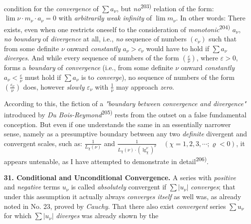\thispagestyle{fancy}

\vspace{0.5cm}

condition for the \textit{convergence} of $\sum a_\nu$, but \textit{no}\textsuperscript{203)} relation of the form: $\lim \nu \cdot m_\nu \cdot a_\nu = 0$ with \textit{arbitrarily weak infinity} of $\lim m_\nu$. In other words: There exists, even when one restricts oneself to the consideration of \textit{monotonic}\textsuperscript{204)} $a_\nu$, \textit{no boundary} of \textit{divergence} at all, i.e., \textit{no} sequence of numbers $(c_\nu)$ such that from some definite $\nu$ onward \textit{constantly} $a_\nu > c_\nu$ would have to hold if $\sum a_\nu$ \textit{diverges}. And while every sequence of numbers of the form $(\frac{\varepsilon}{\nu})$, where $\varepsilon > 0$, forms a \textit{boundary} of \textit{convergence} (i.e., from some definite $\nu$ onward \textit{constantly} $a_\nu < \frac{\varepsilon}{\nu}$ must hold if $\sum a_\nu$ is to \textit{converge}), no sequence of numbers of the form $(\frac{\varepsilon_\nu}{\nu})$ does, however \textit{slowly} $\varepsilon_\nu$ with $\frac{1}{\nu}$ may approach \textit{zero}.

According to this, the fiction of a \textit{"boundary between convergence and divergence"} introduced by \textit{Du Bois-Reymond}\textsuperscript{205)} rests from the outset on a false fundamental conception. But even if one understands the same in an essentially narrower sense, namely as a presumptive boundary between any two \textit{definite} divergent and convergent scales, such as: $\frac{1}{L_{\chi}(\nu)}$ and $\frac{1}{L_{\chi}(\nu) \cdot (\lg_\chi^\nu)^\varrho} \quad (\chi = 1, 2, 3, \cdots ; \varrho < 0) $, it appears untenable, as I have attempted to demonstrate in detail\textsuperscript{206)}.

\vspace{0.5cm}
\textbf{31. Conditional and Unconditional Convergence.} A series with \textit{positive} and \textit{negative} terms $u_\nu$ is called \textit{absolutely} convergent if $\sum |u_\nu|$ \textit{converges}; that under this assumption it actually always \textit{converges itself} as well was, as already noted in No. 23, proved by \textit{Cauchy}. That there also exist \textit{convergent} series $\sum u_\nu$ for which $\sum |u_\nu|$ \textit{diverges} was already shown by the

